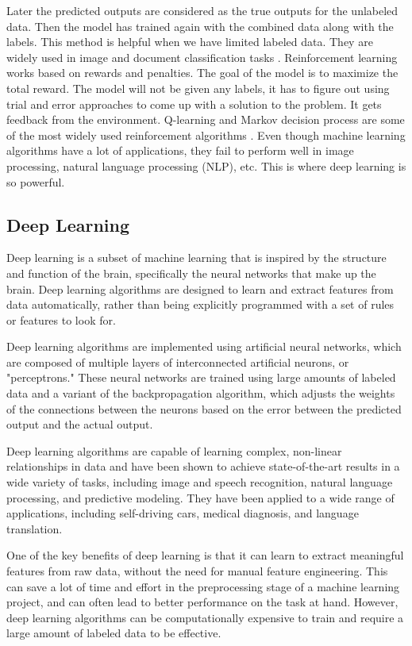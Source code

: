 \documentclass{report}
\begin{document}
	Later the predicted outputs are considered as the true outputs for the unlabeled data. Then the model has trained again with the combined data along with the labels. This method is helpful when we have limited labeled data. They are widely used in image and document classification tasks \cite{yoon2017semi}. Reinforcement learning works based on rewards and penalties. The goal of the model is to maximize the total reward. The model will not be given any labels, it has to figure out using trial and error approaches to come up with a solution to the problem. It gets feedback from the environment. Q-learning and Markov decision process are some of the most widely used reinforcement algorithms \cite{sutton2018reinforcement}.
	Even though machine learning algorithms have a lot of applications, they fail to perform well in image processing, natural language processing (NLP), etc. This is where deep learning is so powerful.
	
	\subsection{Deep Learning}
	Deep learning is a subset of machine learning that is inspired by the structure and function of the brain, specifically the neural networks that make up the brain. Deep learning algorithms are designed to learn and extract features from data automatically, rather than being explicitly programmed with a set of rules or features to look for.
	
	Deep learning algorithms are implemented using artificial neural networks, which are composed of multiple layers of interconnected artificial neurons, or "perceptrons." These neural networks are trained using large amounts of labeled data and a variant of the backpropagation algorithm, which adjusts the weights of the connections between the neurons based on the error between the predicted output and the actual output.
	
	Deep learning algorithms are capable of learning complex, non-linear relationships in data and have been shown to achieve state-of-the-art results in a wide variety of tasks, including image and speech recognition, natural language processing, and predictive modeling. They have been applied to a wide range of applications, including self-driving cars, medical diagnosis, and language translation.
	
	One of the key benefits of deep learning is that it can learn to extract meaningful features from raw data, without the need for manual feature engineering. This can save a lot of time and effort in the preprocessing stage of a machine learning project, and can often lead to better performance on the task at hand. However, deep learning algorithms can be computationally expensive to train and require a large amount of labeled data to be effective.
	
\end{document}
